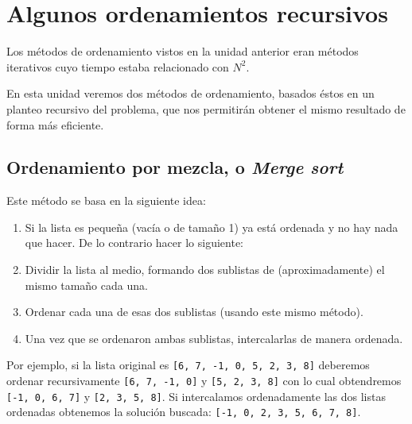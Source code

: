 
%

\chapter{Algunos ordenamientos recursivos}

Los métodos de ordenamiento vistos en la unidad anterior eran métodos
iterativos cuyo tiempo estaba relacionado con $N^2$.

En esta unidad veremos dos métodos de ordenamiento, basados
éstos en un planteo recursivo del problema, que nos permitirán obtener el
mismo resultado de forma más eficiente.

\section{Ordenamiento por mezcla, o {\it Merge sort} }

Este método se basa en la siguiente idea:
\begin{enumerate}
\item Si la lista es pequeña (vacía o de tamaño 1) ya está ordenada y
no hay nada que hacer. De lo contrario hacer lo siguiente:
\item Dividir la lista al medio, formando dos sublistas de (aproximadamente) el
mismo tamaño cada una.
\item Ordenar cada una de esas dos sublistas (usando
este mismo método).
\item Una vez que se ordenaron ambas sublistas, intercalarlas de manera ordenada.
\end{enumerate}

Por ejemplo, si la lista original es \lstinline+[6, 7, -1, 0, 5, 2, 3, 8]+
deberemos ordenar recursivamente \lstinline+[6, 7, -1, 0]+ y 
\lstinline+[5, 2, 3, 8]+ con lo cual obtendremos \lstinline+[-1, 0, 6, 7]+ y
\lstinline+[2, 3, 5, 8]+.  Si intercalamos ordenadamente las dos listas
ordenadas obtenemos la solución buscada: 
\lstinline+[-1, 0, 2, 3, 5, 6, 7, 8]+.

